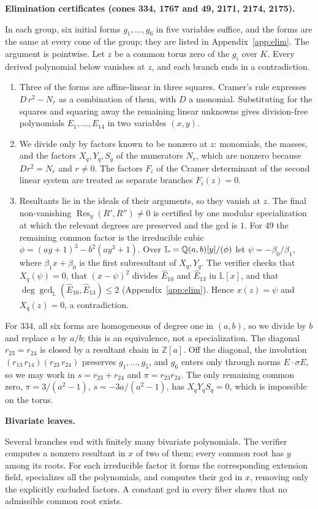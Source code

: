 \documentclass[11pt]{amsart}
\newcommand{\topic}[1]{\par\addvspace{1.4ex}\noindent\textbf{#1}\par\nobreak\smallskip\noindent}
\newcommand{\Z}{\mathbb{Z}}
\theoremstyle{definition}\newtheorem{definition}[theorem]{Definition}\theoremstyle{remark}\newtheorem{remark}[theorem]{Remark}
\begin{document}
\topic{Elimination certificates (cones 334, 1767 and 49, 2171, 2174, 2175).} In each group, six initial forms $g_1,\dots,g_6$ in five variables suffice, and the forms are the same at every cone of the group; they are listed in Appendix~\ref{app:elim}. The argument is pointwise. Let $z$ be a common torus zero of the $g_i$ over $K$. Every derived polynomial below vanishes at $z$, and each branch ends in a contradiction.
\begin{enumerate}
\item Three of the forms are affine-linear in three squares. Cramer's rule expresses $D\,r^2-N_r$ as a combination of them, with $D$ a monomial. Substituting for the squares and squaring away the remaining linear unknowns gives division-free polynomials $E_1,\dots,E_{14}$ in two variables $(x,y)$.
\item We divide only by factors known to be nonzero at $z$: monomials, the masses, and the factors $X_q,Y_q,S_q$ of the numerators $N_r$, which are nonzero because $Dr^2=N_r$ and $r\ne0$. The factors $F_i$ of the Cramer determinant of the second linear system are treated as separate branches $F_i(z)=0$.
\item Resultants lie in the ideals of their arguments, so they vanish at $z$. The final non-vanishing $\operatorname{Res}_y(R',R'')\neq0$ is certified by one modular specialization at which the relevant degrees are preserved and the gcd is $1$. For 49 the remaining common factor is the irreducible cubic $\phi=(ay+1)^3-b^2(ay^3+1)$. Over $\mathbb L=\mathbb{Q}(a,b)[y]/(\phi)$ let $\psi=-\beta_0/\beta_1$, where $\beta_1x+\beta_0$ is the first subresultant of $X_q,Y_q$. The verifier checks that $X_q(\psi)=0$, that $(x-\psi)^2$ divides $\widehat E_{10}$ and $\widehat E_{13}$ in $\mathbb L[x]$, and that $\deg\gcd_{\mathbb L}(\widehat E_{10},\widehat E_{13})\le2$ (Appendix~\ref{app:elim}). Hence $x(z)=\psi$ and $X_q(z)=0$, a contradiction.
\end{enumerate}
For 334, all six forms are homogeneous of degree one in $(a,b)$, so we divide by $b$ and replace $a$ by $a/b$; this is an equivalence, not a specialization. The diagonal $r_{23}=r_{24}$ is closed by a resultant chain in $\Z[a]$. Off the diagonal, the involution $(r_{13}\,r_{14})(r_{23}\,r_{24})$ preserves $g_1,\dots,g_5$, and $g_6$ enters only through norms $E\cdot\sigma E$, so we may work in $s=r_{23}+r_{24}$ and $\pi=r_{23}r_{24}$. The only remaining common zero, $\pi=3/(a^2-1)$, $s=-3a/(a^2-1)$, has $X_qY_qS_q=0$, which is impossible on the torus.

\topic{Bivariate leaves.} Several branches end with finitely many bivariate polynomials. The verifier computes a nonzero resultant in $x$ of two of them; every common root has $y$ among its roots. For each irreducible factor it forms the corresponding extension field, specializes all the polynomials, and computes their gcd in $x$, removing only the explicitly excluded factors. A constant gcd in every fiber shows that no admissible common root exists.
\end{document}

